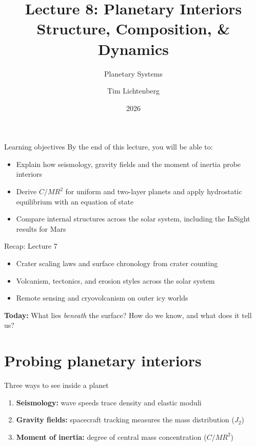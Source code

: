 \documentclass[aspectratio=169, 11pt]{beamer}
\title[Lecture 8: Planetary Interiors]{Lecture 8: Planetary Interiors\\Structure, Composition, \& Dynamics}
\subtitle{Planetary Systems}
\author[L8]{Tim Lichtenberg}
\institute{Kapteyn Astronomical Institute\\University of Groningen}
\date{2026}
\begin{document}
\begin{frame}
  \titlepage
\end{frame}

\begin{frame}{Learning objectives}
  By the end of this lecture, you will be able to:
  \vskip8pt
  \begin{itemize}
    \item Explain how seismology, gravity fields and the moment of inertia probe interiors
    \item Derive $C/MR^2$ for uniform and two-layer planets and apply hydrostatic equilibrium with an equation of state
    \item Compare internal structures across the solar system, including the InSight results for Mars
  \end{itemize}
\end{frame}

\begin{frame}{Recap: Lecture 7}
  \begin{itemize}
    \item Crater scaling laws and surface chronology from crater counting
    \item Volcanism, tectonics, and erosion styles across the solar system
    \item Remote sensing and cryovolcanism on outer icy worlds
  \end{itemize}
  \vskip8pt
  \textbf{Today:} What lies \textit{beneath} the surface? How do we know, and what does it tell us?
\end{frame}


\section{Probing planetary interiors}

\begin{frame}{Three ways to see inside a planet}
  \begin{enumerate}\setlength\itemsep{4pt}
    \item \textbf{Seismology:} wave speeds trace density and elastic moduli
    \item \textbf{Gravity fields:} spacecraft tracking measures the mass distribution ($J_2$)
    \item \textbf{Moment of inertia:} degree of central mass concentration ($C/MR^2$)
  \end{enumerate}
  \vskip10pt
\end{frame}
\end{document}
